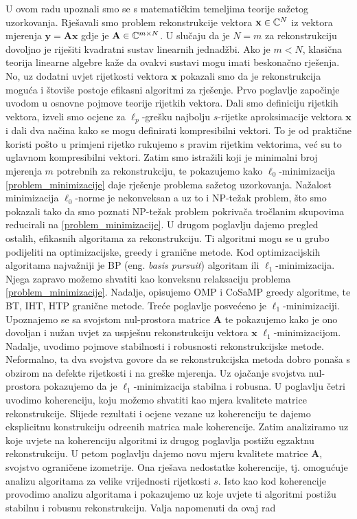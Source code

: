 \documentclass[a4paper,twoside,12pt]{memoir} %
\newcommand{\vect}[1]{\mathbf{#1}}
\renewcommand{\vec}{\vect}
\begin{document}
\begin{sazetak}
    U ovom radu upoznali smo se s matemati\v{c}kim temeljima teorije sa\v{z}etog uzorkovanja. Rje\v{s}avali smo problem rekonstrukcije vektora $\vec x \in \C^N$ iz vektora mjerenja $\vec y = \vec {Ax}$ gdje je $\vec A \in \C^{m \times N}$. U slu\v{c}aju da je $N = m$ za rekonstrukciju dovoljno je rije\v{s}iti kvadratni sustav linearnih jednad\v{z}bi. Ako je $m < N$, klasi\v{c}na teorija linearne algebre ka\v{z}e da ovakvi sustavi mogu imati beskona\v{c}no rje\v{s}enja. No, uz dodatni uvjet rijetkosti vektora $\vec x$ pokazali smo da je rekonstrukcija mogu\'ca i \v{s}tovi\v{s}e postoje efikasni algoritmi za rje\v{s}enje. Prvo poglavlje zapo\v{c}inje uvodom u osnovne pojmove teorije rijetkih vektora. Dali smo definiciju rijetkih vektora, izveli smo ocjene za $\ell_p$-gre\v{s}ku najbolju $s$-rijetke aproksimacije vektora $\vec x$ i dali dva na\v{c}ina kako se mogu definirati kompresibilni vektori. To je od prakti\v{c}ne koristi po\v{s}to u primjeni rijetko rukujemo s pravim rijetkim vektorima, ve\'c su to uglavnom kompresibilni vektori. Zatim smo istra\v{z}ili koji je minimalni broj mjerenja $m$ potrebnih za rekonstrukciju, te pokazujemo kako $\ell_0$-minimizacija \eqref{problem_minimizacije} daje rje\v{s}enje problema sa\v{z}etog uzorkovanja. Na\v{z}alost minimizacija $\ell_0$-norme je nekonveksan a uz to i NP-te\v{z}ak problem, \v{s}to smo pokazali tako da smo poznati NP-te\v{z}ak problem pokriva\v{c}a tro\v{c}lanim skupovima reducirali na \eqref{problem_minimizacije}. U drugom poglavlju dajemo pregled ostalih, efikasnih algoritama za rekonstrukciju. Ti algoritmi mogu se u grubo podijeliti na optimizacijske, greedy i grani\v{c}ne metode. Kod optimizacijskih algoritama najva\v{z}niji je BP (eng. \textit{basis pursuit}) algoritam ili $\ell_1$-minimizacija. Njega zapravo mo\v{z}emo shvatiti kao konveksnu relaksaciju problema \eqref{problem_minimizacije}. Nadalje, opisujemo OMP i CoSaMP greedy algoritme, te BT, IHT, HTP grani\v{c}ne metode. Tre\'ce poglavlje posve\'ceno je $\ell_1$-minimizaciji. Upoznajemo se sa svojstom nul-prostora matrice $\vec A$ te pokazujemo kako je ono dovoljan i nu\v{z}an uvjet za uspje\v{s}nu rekonstrukciju vektora $\vec x$ $\ell_1$-minimizacijom. Nadalje, uvodimo pojmove stabilnosti i robusnosti rekonstrukcijske metode. Neformalno, ta dva svojstva govore da se rekonstrukcijska metoda dobro pona\v{s}a s obzirom na defekte rijetkosti i na gre\v{s}ke mjerenja. Uz oja\v{c}anje svojstva nul-prostora pokazujemo da je $\ell_1$-minimizacija stabilna i robusna. U poglavlju \v{c}etri uvodimo koherenciju, koju mo\v{z}emo shvatiti kao mjera kvalitete matrice rekonstrukcije. Slijede rezultati i ocjene vezane uz koherenciju te dajemo eksplicitnu konstrukciju odre\dj enih matrica male koherencije. Zatim analiziramo uz koje uvjete na koherenciju algoritmi iz drugog poglavlja posti\v{z}u egzaktnu rekonstrukciju. U petom poglavlju dajemo novu mjeru kvalitete matrice $\vec A$, svojstvo ograni\v{c}ene izometrije. Ona rje\v{s}ava nedostatke koherencije, tj. omogu\'cuje analizu algoritama za velike vrijednosti rijetkosti $s$. Isto kao kod koherencije provodimo analizu algoritama i pokazujemo uz koje uvjete ti algoritmi posti\v{z}u stabilnu i robusnu rekonstrukciju. Valja napomenuti da ovaj rad 
\end{sazetak}
\end{document}
